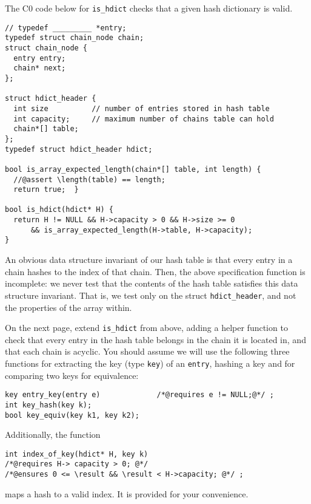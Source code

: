 \clearpage
{}

The C0 code below for \lstinline'is_hdict' checks that a given hash
dictionary is valid.
\begin{lstlisting}
// typedef _________ *entry;
typedef struct chain_node chain;
struct chain_node {
  entry entry;
  chain* next;
};

struct hdict_header {
  int size          // number of entries stored in hash table
  int capacity;     // maximum number of chains table can hold
  chain*[] table;
};
typedef struct hdict_header hdict;

bool is_array_expected_length(chain*[] table, int length) {
  //@assert \length(table) == length;
  return true;  }

bool is_hdict(hdict* H) {
  return H != NULL && H->capacity > 0 && H->size >= 0
      && is_array_expected_length(H->table, H->capacity);
}
\end{lstlisting}

An obvious data structure invariant of our hash table is that every
entry in a chain hashes to the index of that chain.  Then, the above
specification function is incomplete: we never test that the contents
of the hash table satisfies this data structure invariant.  That is, we
test only on the struct \lstinline'hdict_header', and not the properties
of the array within.

On the next page, extend \lstinline'is_hdict' from above, adding a helper
function to check that every entry in the hash table belongs in the
chain it is located in, and that each chain is acyclic.  You should
assume we will use the following three functions for extracting the
key (type \lstinline'key') of an \lstinline'entry', hashing a key and
for comparing two keys for equivalence:

\begin{lstlisting}[belowskip=0pt]
key entry_key(entry e)             /*@requires e != NULL;@*/ ;
int key_hash(key k);
bool key_equiv(key k1, key k2);
\end{lstlisting}
Additionally, the function
\begin{lstlisting}[belowskip=0pt]
int index_of_key(hdict* H, key k)
/*@requires H-> capacity > 0; @*/
/*@ensures 0 <= \result && \result < H->capacity; @*/ ;
\end{lstlisting}
maps a hash to a valid index.  It is provided for your convenience.

